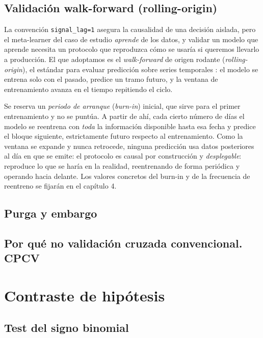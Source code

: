 \subsection{Validación walk-forward (rolling-origin)}
\label{sec:cpcv-walkforward}

La convención \texttt{signal\_lag=1} asegura la causalidad de una decisión aislada, pero el meta-learner del caso de estudio \emph{aprende} de los datos, y validar un modelo que aprende necesita un protocolo que reproduzca cómo se usaría si queremos llevarlo a producción. El que adoptamos es el \emph{walk-forward} de origen rodante (\emph{rolling-origin}), el estándar para evaluar predicción sobre series temporales \cite{tashman2000, bergmeir2018}: el modelo se entrena solo con el pasado, predice un tramo futuro, y la ventana de entrenamiento avanza en el tiempo repitiendo el ciclo.

Se reserva un \emph{periodo de arranque} (\emph{burn-in}) inicial, que sirve para el primer entrenamiento y no se puntúa. A partir de ahí, cada cierto número de días el modelo se reentrena con \emph{toda} la información disponible hasta esa fecha y predice el bloque siguiente, estrictamente futuro respecto al entrenamiento. Como la ventana se expande y nunca retrocede, ninguna predicción usa datos posteriores al día en que se emite: el protocolo es causal por construcción y \emph{desplegable}: reproduce lo que se haría en la realidad, reentrenando de forma periódica y operando hacia delante. Los valores concretos del burn-in y de la frecuencia de reentreno se fijarán en el capítulo 4.

\subsection{Purga y embargo}
\label{sec:cpcv-purga}


\subsection{Por qué no validación cruzada convencional. CPCV}
\label{sec:cpcv-cpcv}

\section{Contraste de hipótesis}
\label{sec:tests}

\subsection{Test del signo binomial}
\label{sec:tests-sign}

